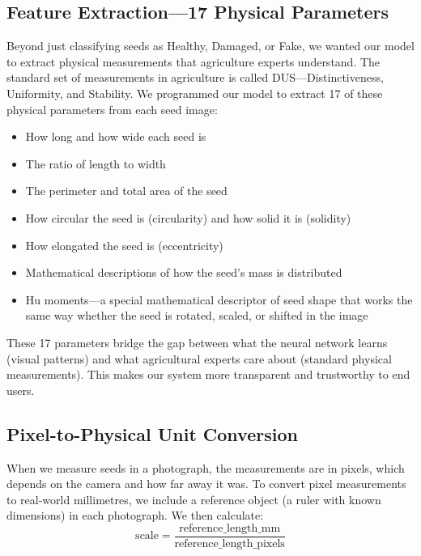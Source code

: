 \subsection{Feature Extraction---17 Physical Parameters}

Beyond just classifying seeds as Healthy, Damaged, or Fake, we wanted our model to extract physical measurements that agriculture experts understand. The standard set of measurements in agriculture is called DUS—Distinctiveness, Uniformity, and Stability. We programmed our model to extract 17 of these physical parameters from each seed image:

\begin{itemize}
    \item How long and how wide each seed is
    \item The ratio of length to width
    \item The perimeter and total area of the seed
    \item How circular the seed is (circularity) and how solid it is (solidity)
    \item How elongated the seed is (eccentricity)
    \item Mathematical descriptions of how the seed's mass is distributed
    \item Hu moments—a special mathematical descriptor of seed shape that works the same way whether the seed is rotated, scaled, or shifted in the image
\end{itemize}

These 17 parameters bridge the gap between what the neural network learns (visual patterns) and what agricultural experts care about (standard physical measurements). This makes our system more transparent and trustworthy to end users.

\subsection{Pixel-to-Physical Unit Conversion}

When we measure seeds in a photograph, the measurements are in pixels, which depends on the camera and how far away it was. To convert pixel measurements to real-world millimetres, we include a reference object (a ruler with known dimensions) in each photograph. We then calculate:
\begin{equation}
\text{scale} = \frac{\text{reference\_length\_mm}}{\text{reference\_length\_pixels}}
\end{equation}

